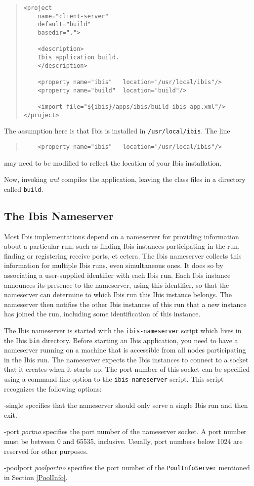 \documentclass[10pt]{article}
\newcommand{\mysubsection}[1]{\subsection{#1}\label{#1}}
\begin{document}
\begin{quote}
\begin{verbatim}
<project
    name="client-server"
    default="build"
    basedir=".">

    <description>
    Ibis application build.
    </description>

    <property name="ibis"   location="/usr/local/ibis"/>
    <property name="build"  location="build"/>

    <import file="${ibis}/apps/ibis/build-ibis-app.xml"/>
</project>
\end{verbatim}
\end{quote}
The assumption here is that Ibis is installed in
\texttt{/usr/local/ibis}.
The line
\begin{quote}
\begin{verbatim}
    <property name="ibis"   location="/usr/local/ibis"/>
\end{verbatim}
\end{quote}
\noindent
may need to be modified to reflect the location of your Ibis
installation.

Now, invoking \emph{ant} compiles the application, leaving the class files
in a directory called \texttt{build}.

\mysubsection{The Ibis Nameserver}

Most Ibis implementations depend on a nameserver for providing
information about a particular run, such as finding Ibis instances
participating in the run, finding or registering receive ports, et cetera.
The Ibis nameserver collects this information for multiple Ibis
runs, even simultaneous ones. It does so by associating a user-supplied
identifier with each Ibis run. Each Ibis instance announces its
presence to the nameserver, using this identifier, so that the
nameserver can determine to which Ibis run this Ibis instance belongs.
The nameserver then notifies the other Ibis instances of this run that
a new instance has joined the run, including some identification of
this instance.

The Ibis nameserver is started with the \texttt{ibis-nameserver} script which
lives in the Ibis \texttt{bin} directory. Before starting an Ibis application,
you need to have a nameserver running on a machine that is accessible
from all nodes participating in the Ibis run.
The nameserver expects the Ibis instances to connect to a
socket that it creates when it starts up.
The port number of this socket can be specified using a command line
option to the \texttt{ibis-nameserver} script. This script recognizes
the following options:
\begin{description}
\item{-single}
specifies that the nameserver should only serve a single Ibis run
and then exit.
\item{-port \emph{portno}}
specifies the port number of the nameserver socket.
A port number must be between 0 and 65535, inclusive. Usually,
port numbers below 1024 are reserved for other purposes.
\item{-poolport \emph{poolportno}}
specifies the port number of the \texttt{PoolInfoServer} mentioned
in Section \ref{PoolInfo}.
\end{description}
\end{document}
